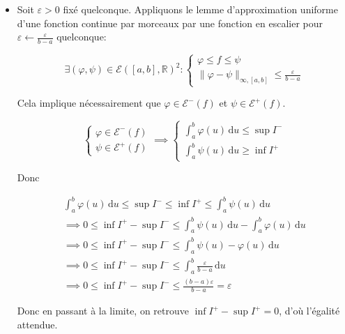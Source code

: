 \documentclass{article}
\renewenvironment{question_kholle}[2][ ]
{
	\subsection{\texorpdfstring{#2}{}}
	\notblank{#1}
	{
		\noindent #1
		\bigbreak
	}
	{}
	\begin{proof}
}
{
	\end{proof}
}
\begin{document}
\begin{question_kholle}
\begin{itemize}[label=$\lozenge$]
    \item Soit $\varepsilon > 0$ fixé quelconque.
          Appliquons le lemme d'approximation uniforme d'une fonction continue par morceaux par une fonction en escalier pour $\varepsilon \leftarrow \frac{\varepsilon}{b-a}$ quelconque:

          $$
            \exists (\varphi, \psi) \in \mathcal{E}([a, b], \mathbb{R})^{2} : \left\{ \begin{array}{ll}
              \varphi \leqslant f \leqslant \psi \\
              \|\varphi - \psi\| _{\infty, [a, b]} \leqslant \frac{\varepsilon}{b-a}
            \end{array}\right.
          $$

          Cela implique nécessairement que $\varphi \in \mathcal{E}^{-}(f)$ et $\psi \in \mathcal{E}^{+}(f)$.

          $$
            \left\{ \begin{array}{ll}
              \varphi \in \mathcal{E}^{-}(f) \\
              \psi \in \mathcal{E}^{+}(f)
            \end{array}\right. \implies \left\{ \begin{array}{ll}
              \int_{a}^{b} \varphi (u) \, \mathrm du \leqslant \sup I^{-} \\
              \int_{a}^{b} \psi(u) \, \mathrm du \geqslant \inf I^{+}
            \end{array}\right.
          $$

          Donc

          \begin{align*}
            \int_{a}^{b} \varphi(u) \, \mathrm du  \leqslant \sup I^{-} \leqslant \inf I^{+} \leqslant \int_{a}^{b} \psi(u) \, \mathrm du     \\
            \implies 0 \leqslant \inf I^{+} - \sup I^{-} \leqslant \int_{a}^{b} \psi(u) \, \mathrm du - \int_{a}^{b} \varphi(u) \, \mathrm du \\
            \implies 0 \leqslant \inf I^{+} - \sup I^{-} \leqslant \int_{a}^{b} \psi(u) - \varphi(u) \, \mathrm du                            \\
            \implies 0 \leqslant \inf I^{+} - \sup I^{-} \leqslant \int_{a}^{b} \frac{\varepsilon}{b-a} \, \mathrm du                         \\
            \implies 0 \leqslant \inf I^{+} - \sup I^{-} \leqslant \frac{(b-a)\varepsilon}{b-a} = \varepsilon
          \end{align*}


          Donc en passant à la limite, on retrouve $\inf I^{+} - \sup I^{+} = 0$, d'où l'égalité attendue.
  \end{itemize}
\end{question_kholle}
\end{document}

